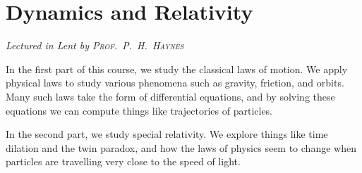 \chapter[Dynamics and Relativity \\ \textnormal{\emph{Lectured in Lent \oldstylenums{2021} by \textsc{Prof.\ P.\ H.\ Haynes}}}]{Dynamics and Relativity}
\emph{\Large Lectured in Lent  by \textsc{Prof.\ P.\ H.\ Haynes}}

In the first part of this course, we study the classical laws of motion.
We apply physical laws to study various phenomena such as gravity, friction, and orbits.
Many such laws take the form of differential equations, and by solving these equations we can compute things like trajectories of particles.

In the second part, we study special relativity.
We explore things like time dilation and the twin paradox, and how the laws of physics seem to change when particles are travelling very close to the speed of light.


